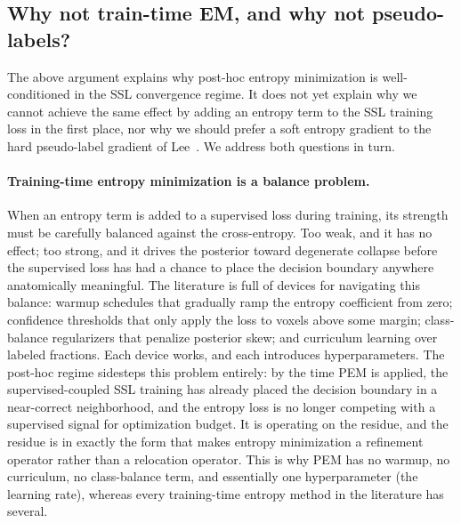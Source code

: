 \subsection{Why not train-time EM, and why not pseudo-labels?}
\label{sec:theory:comparison}

The above argument explains why post-hoc entropy minimization is well-conditioned in the SSL convergence regime. It does not yet explain why we cannot achieve the same effect by adding an entropy term to the SSL training loss in the first place, nor why we should prefer a soft entropy gradient to the hard pseudo-label gradient of Lee~\cite{lee2013pseudolabel}. We address both questions in turn.

\paragraph{Training-time entropy minimization is a balance problem.}
When an entropy term is added to a supervised loss during training, its strength must be carefully balanced against the cross-entropy. Too weak, and it has no effect; too strong, and it drives the posterior toward degenerate collapse before the supervised loss has had a chance to place the decision boundary anywhere anatomically meaningful. The literature is full of devices for navigating this balance: warmup schedules that gradually ramp the entropy coefficient from zero; confidence thresholds that only apply the loss to voxels above some margin; class-balance regularizers that penalize posterior skew; and curriculum learning over labeled fractions. Each device works, and each introduces hyperparameters. The post-hoc regime sidesteps this problem entirely: by the time PEM is applied, the supervised-coupled SSL training has already placed the decision boundary in a near-correct neighborhood, and the entropy loss is no longer competing with a supervised signal for optimization budget. It is operating on the residue, and the residue is in exactly the form that makes entropy minimization a refinement operator rather than a relocation operator. This is why PEM has no warmup, no curriculum, no class-balance term, and essentially one hyperparameter (the learning rate), whereas every training-time entropy method in the literature has several.

